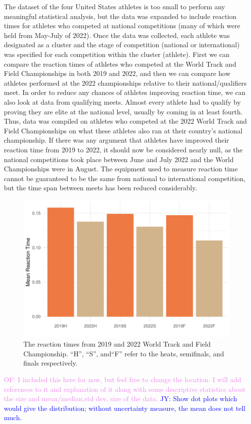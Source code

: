 \documentclass[12pt, letterpaper, titlepage]{article}
\newcommand{\jy}[1]{\textcolor{blue}{JY: #1}}
\newcommand{\of}[1]{\textcolor{violet}{OF: #1}}
\begin{document}
The dataset of the four United States athletes 
is too small to perform any meaningful statistical analysis, but
the data was expanded to include reaction times for athletes who competed at 
national competitions (many of which were held from May-July of 2022). Once the 
data was collected, each athlete was designated as a cluster and the stage of
competition (national or international) was specified for each competition 
within the cluster (athlete). First we can compare the reaction times of athletes who
competed at the World Track and Field Championships in both 2019 and 2022, and 
then we can compare how athletes performed at the 2022 championships relative 
to their national/qualifiers meet. In order to reduce any chances
of athletes improving reaction time, we can also look at data from qualifying meets.
Almost every athlete had to qualify by proving they are elite at the national level, 
usually by coming in at least fourth. Thus, data was compiled on athletes who competed
at the 2022 World Track and Field Championships on what these athletes also ran 
at their country's national championship. If there was any argument that athletes
have improved their reaction time from 2019 to 2022, it should now be considered
nearly null, as the national competitions took place between June and July 2022 
and the World Championships were in August. The equipment used to measure reaction
time cannot be guaranteed to be the same from national to international
competition, but the time span between meets has been reduced considerably. 

\begin{figure}[tbp]
  \centering
  \includegraphics{2019vs2022BarGraph}
  \caption{The reaction times from 2019 and 2022 World Track and Field
  Championship. ``H'', ``S'', and``F'' refer to the heats, semifinals, and finals
  respectively.}
  \label{fig:2019vs2022Graph}
\end{figure}
\of{I included this here for now, but feel free to change the location.  I will
add references to it and explanation of it along with some descriptive statistics about
the size and mean/median,std dev, size of the data.}
\jy{Show dot plots which would give the distribution; without uncertainty
  measure, the mean does not tell much.}
\end{document}
